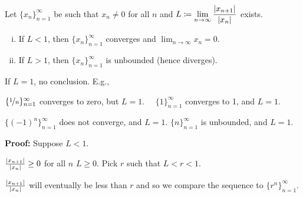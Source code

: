 \documentclass[10pt,aspectratio=149]{beamer}
\begin{document}
\begin{frame}

\begin{lemma}
Let $\{ x_n \}_{n=1}^\infty$ be such that $x_n \not= 0$ for all $n$ and
$\displaystyle L \coloneqq \lim_{n\to\infty} \frac{\left\lvert {x_{n+1}} \right\rvert}{\left\lvert {x_n} \right\rvert}$ exists.
\pause
\begin{enumerate}[(i)]
\item
If $L < 1$, then $\{ x_n \}_{n=1}^\infty$ converges and $\displaystyle \lim_{n\to\infty} x_n = 0$.
\item
\pause
If $L > 1$, then $\{ x_n \}_{n=1}^\infty$ is unbounded (hence diverges).
\end{enumerate}
\end{lemma}

\pause
If $L=1$, no conclusion. E.g.,

\pause
$\{ \nicefrac{1}{n} \}_{n=1}^\infty$ converges to zero, but $L=1$.
\pause
\quad\qquad~\,
$\{ 1 \}_{n=1}^\infty$ converges to 1, and $L=1$.

\pause
$\{ {(-1)}^n \}_{n=1}^\infty$ does not converge, and $L=1$.
\pause
\qquad
$\{  n \}_{n=1}^\infty$ is unbounded, and $L=1$.

\pause
\medskip

\textbf{Proof:}
Suppose $L < 1$.

\pause
\medskip

$\frac{\left\lvert {x_{n+1}} \right\rvert}{\left\lvert {x_n} \right\rvert} \geq 0$ for all $n$ \wthus $L \geq 0$.
\qquad
\pause
Pick $r$ such that $L < r < 1$.

\pause
\medskip

$\frac{\left\lvert {x_{n+1}} \right\rvert}{\left\lvert {x_n} \right\rvert}$ will eventually be less than $r$ and
so we compare the sequence to $\{ r^n \}_{n=1}^\infty$.

\pause
\begin{center}
\end{center}

\end{frame}
\end{document}
